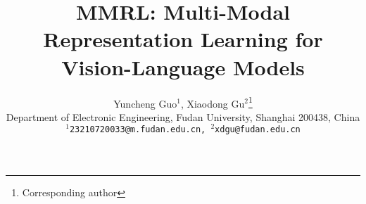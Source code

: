 \documentclass[10pt,twocolumn,letterpaper]{article}
\title{MMRL: Multi-Modal Representation Learning for Vision-Language Models}
\author{Yuncheng Guo$^1$, Xiaodong Gu$^2$\thanks{Corresponding author}\\
Department of Electronic Engineering, Fudan University, Shanghai 200438, China\\
{\tt\small $^1$23210720033@m.fudan.edu.cn, $^2$xdgu@fudan.edu.cn}
}
\begin{document}
\maketitle
    







{
    \small
    
    
}

\end{document}
